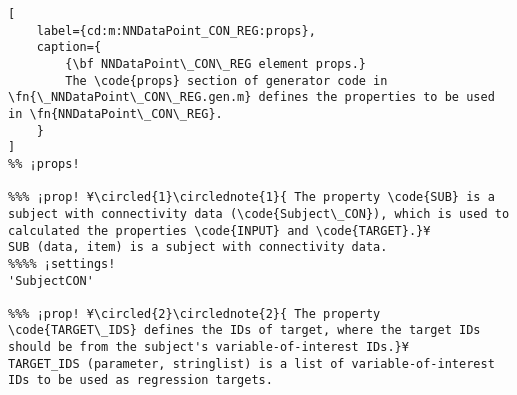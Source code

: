 \documentclass{tufte-handout}
\begin{document}
\begin{lstlisting}[
	label={cd:m:NNDataPoint_CON_REG:props},
	caption={
		{\bf NNDataPoint\_CON\_REG element props.}
		The \code{props} section of generator code in \fn{\_NNDataPoint\_CON\_REG.gen.m} defines the properties to be used in \fn{NNDataPoint\_CON\_REG}.
	}
]
%% ¡props!

%%% ¡prop! ¥\circled{1}\circlednote{1}{ The property \code{SUB} is a subject with connectivity data (\code{Subject\_CON}), which is used to calculated the properties \code{INPUT} and \code{TARGET}.}¥
SUB (data, item) is a subject with connectivity data.
%%%% ¡settings!
'SubjectCON'

%%% ¡prop! ¥\circled{2}\circlednote{2}{ The property \code{TARGET\_IDS} defines the IDs of target, where the target IDs should be from the subject's variable-of-interest IDs.}¥
TARGET_IDS (parameter, stringlist) is a list of variable-of-interest IDs to be used as regression targets.

\end{lstlisting}

\clearpage
\end{document}

